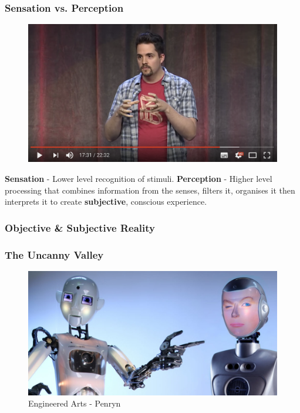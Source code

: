 \begin{frame}
	\frametitle{Sensation vs. Perception}	
	\begin{figure}
		\href{https://youtu.be/Ebwtq1HZJ2A?t=1051}{ \includegraphics[scale=.4]{assets/sensation}  }
	\end{figure}
	\textbf{Sensation} - Lower level recognition of stimuli.
	\textbf{Perception} - Higher level processing that combines information from the senses, filters it, organises it then interprets it to create \textbf{subjective}, conscious experience. 
\end{frame}


\begin{frame}
	\frametitle{Objective \& Subjective Reality}
	
\end{frame}


\begin{frame}
	\frametitle{The Uncanny Valley}
	\begin{figure}
		 \includegraphics[scale=.3]{assets/bots}  
		 \caption{Engineered Arts - Penryn}
	\end{figure}
\end{frame}

